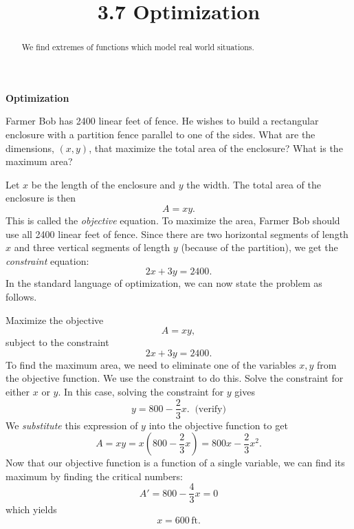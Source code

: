 \documentclass{ximera}
\title{3.7 Optimization}
\begin{document}
\begin{abstract}
We find extremes of functions which model real world situations.
\end{abstract}

\maketitle

\begin{center}
\textbf{Optimization}
\end{center}
 

\begin{example}[example 1]
Farmer Bob has 2400 linear feet of fence. He wishes to build a rectangular enclosure with a partition fence parallel to one of the sides.  
What are the dimensions, $(x,y)$, that maximize the total area of the enclosure? What is the maximum area?


\begin{image}
\end{image}
Let $x$ be the length of the enclosure and $y$ the width.  The total area of the enclosure is then
\[A= xy.\]
This is called the {\it objective} equation.
To maximize the area, Farmer Bob should use all 2400 linear feet of fence.  Since there are two horizontal segments of length $x$ and three vertical segments of length $y$ (because of the partition), we get the {\it constraint} equation:
\[2x+3y=2400.\]
In the standard language of optimization, we can now state the problem as follows.

Maximize the objective
\[A = xy,\]
subject to the constraint 
\[2x+3y = 2400.\]
To find the maximum area, we need to eliminate one of the variables $x, y$ from the objective function.
We use the constraint to do this.  Solve the constraint for either $x$ or $y$.
In this case, solving the constraint for $y$ gives
\[y = 800 - \frac23 x. \;\; \text{(verify)}\]
We {\it substitute} this expression of $y$ into the objective function to get 
\[A = xy = x(800 - \frac23 x) = 800x - \frac23 x^2.\]
Now that our objective function is a function of a single variable, we can find its maximum by finding the critical numbers:
\[A' = 800 - \frac43 x = 0 \]
which yields
\[x= 600 \,\mbox{ft.}\]


\end{example}
\end{document}
